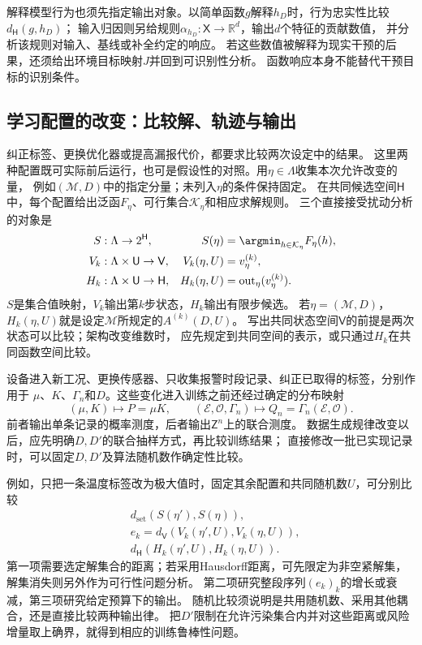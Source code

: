 解释模型行为也须先指定输出对象。以简单函数$g$解释$h_D$时，行为忠实性比较$d_{\mathsf H}(g,h_D)$；
输入归因则另给规则$\alpha_{h_D}:\mathsf X\to\mathbb R^d$，输出$d$个特征的贡献数值，
并分析该规则对输入、基线或补全约定的响应。
若这些数值被解释为现实干预的后果，还须给出环境目标映射$J$并回到可识别性分析。
函数响应本身不能替代干预目标的识别条件。

\subsection{学习配置的改变：比较解、轨迹与输出}
\label{sec:future-ml-changing-conditions}

纠正标签、更换优化器或提高漏报代价，都要求比较两次设定中的结果。
这里两种配置既可实际前后运行，也可是假设性的对照。用$\eta\in\Lambda$收集本次允许改变的量，
例如$(\mathcal M,D)$中的指定分量；未列入$\eta$的条件保持固定。
在共同候选空间$\mathsf H$中，每个配置给出泛函$F_\eta$、可行集合$\mathcal K_\eta$和相应求解规则。
三个直接接受扰动分析的对象是
\begin{equation}
  \begin{aligned}
    S&:\Lambda\to2^{\mathsf H},
      &S(\eta)&=\argmin_{h\in\mathcal K_\eta}F_\eta(h),\\
    V_k&:\Lambda\times\mathsf U\to\mathsf V,
      &V_k(\eta,U)&=v_\eta^{(k)},\\
    H_k&:\Lambda\times\mathsf U\to\mathsf H,
      &H_k(\eta,U)&=\operatorname{out}_\eta(v_\eta^{(k)}).
  \end{aligned}
  \label{eq:future-task-configuration-response-maps}
\end{equation}
$S$是集合值映射，$V_k$输出第$k$步状态，$H_k$输出有限步候选。
若$\eta=(\mathcal M,D)$，$H_k(\eta,U)$就是设定$\mathcal M$所规定的$A^{(k)}(D,U)$。
写出共同状态空间$\mathsf V$的前提是两次状态可以比较；架构改变维数时，
应先规定到共同空间的表示，或只通过$H_k$在共同函数空间比较。

设备进入新工况、更换传感器、只收集报警时段记录、纠正已取得的标签，分别作用于
$\mu$、$K$、$\Gamma_n$和$D$。这些变化进入训练之前还经过确定的分布映射
\[
  (\mu,K)\mapsto P=\mu K,\qquad
  (\mathcal E,\mathcal O,\Gamma_n)\mapsto
       Q_n=\Gamma_n(\mathcal E,\mathcal O).
\]
前者输出单条记录的概率测度，后者输出$\mathsf Z^n$上的联合测度。
数据生成规律改变以后，应先明确$D,D'$的联合抽样方式，再比较训练结果；
直接修改一批已实现记录时，可以固定$D,D'$及算法随机数作确定性比较。


例如，只把一条温度标签改为极大值时，固定其余配置和共同随机数$U$，可分别比较
\[
  \begin{aligned}
    &d_{\mathrm{set}}(S(\eta'),S(\eta)),\\
    &e_k=d_{\mathsf V}(V_k(\eta',U),V_k(\eta,U)),\\
    &d_{\mathsf H}(H_k(\eta',U),H_k(\eta,U)).
  \end{aligned}
\]
第一项需要选定解集合的距离；若采用Hausdorff距离，可先限定为非空紧解集，
解集消失则另外作为可行性问题分析。
第二项研究整段序列$(e_k)_k$的增长或衰减，第三项研究给定预算下的输出。
随机比较须说明是共用随机数、采用其他耦合，还是直接比较两种输出律。
把$D'$限制在允许污染集合内并对这些距离或风险增量取上确界，就得到相应的训练鲁棒性问题。

